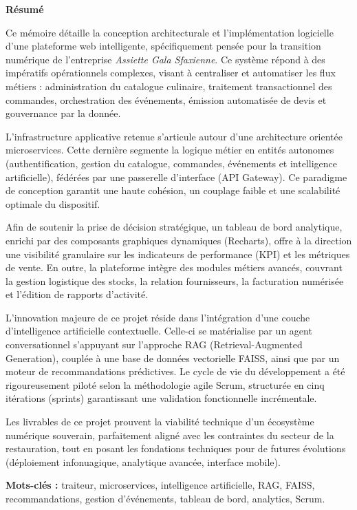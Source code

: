 \newpage
\thispagestyle{plain}

\begin{center}
    {\Large \textbf{Résumé}}\\[1cm]
\end{center}

Ce mémoire détaille la conception architecturale et l'implémentation logicielle d'une plateforme web intelligente, spécifiquement pensée pour la transition numérique de l'entreprise \textit{Assiette Gala Sfaxienne}. Ce système répond à des impératifs opérationnels complexes, visant à centraliser et automatiser les flux métiers : administration du catalogue culinaire, traitement transactionnel des commandes, orchestration des événements, émission automatisée de devis et gouvernance par la donnée.

L'infrastructure applicative retenue s'articule autour d'une architecture orientée microservices. Cette dernière segmente la logique métier en entités autonomes (authentification, gestion du catalogue, commandes, événements et intelligence artificielle), fédérées par une passerelle d'interface (API Gateway). Ce paradigme de conception garantit une haute cohésion, un couplage faible et une scalabilité optimale du dispositif.

Afin de soutenir la prise de décision stratégique, un tableau de bord analytique, enrichi par des composants graphiques dynamiques (Recharts), offre à la direction une visibilité granulaire sur les indicateurs de performance (KPI) et les métriques de vente. En outre, la plateforme intègre des modules métiers avancés, couvrant la gestion logistique des stocks, la relation fournisseurs, la facturation numérisée et l'édition de rapports d'activité.

L'innovation majeure de ce projet réside dans l'intégration d'une couche d'intelligence artificielle contextuelle. Celle-ci se matérialise par un agent conversationnel s'appuyant sur l'approche RAG (Retrieval-Augmented Generation), couplée à une base de données vectorielle FAISS, ainsi que par un moteur de recommandations prédictives. Le cycle de vie du développement a été rigoureusement piloté selon la méthodologie agile Scrum, structurée en cinq itérations (sprints) garantissant une validation fonctionnelle incrémentale.

Les livrables de ce projet prouvent la viabilité technique d'un écosystème numérique souverain, parfaitement aligné avec les contraintes du secteur de la restauration, tout en posant les fondations techniques pour de futures évolutions (déploiement infonuagique, analytique avancée, interface mobile).

\vspace{0.8cm}
\noindent\textbf{Mots-clés :} traiteur, microservices, intelligence artificielle, RAG, FAISS, recommandations, gestion d'événements, tableau de bord, analytics, Scrum.

\clearpage
